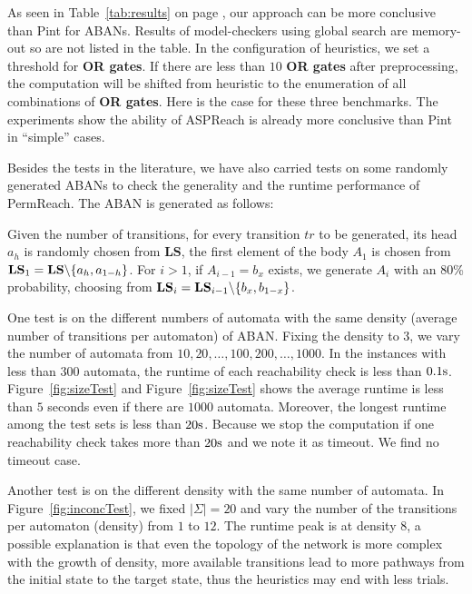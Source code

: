 As seen in Table~\ref{tab:results} on page \pageref{tab:results}, our approach can be more conclusive than Pint for ABANs.
Results of model-checkers using global search are memory-out so are not listed in the table.
In the configuration of heuristics, we set a threshold for \textbf{OR gates}.
If there are less than $10$ \textbf{OR gates} after preprocessing, the computation will be shifted from heuristic to the enumeration of all combinations of \textbf{OR gates}.
Here is the case for these three benchmarks. The experiments show the ability of ASPReach is already more conclusive than Pint in ``simple'' cases.

Besides the tests in the literature, we have also carried tests on some randomly generated ABANs to check the generality and the runtime performance of PermReach. 
The ABAN is generated as follows:

Given the number of transitions, for every transition $tr$ to be generated, its head $a_h$ is randomly chosen from $\mathbf{LS}$, the first element of the body $A_1$ is chosen from $\mathbf{LS}_1=\mathbf{LS}\miset{a_h,a_{1-h}}$.
For $i>1$, if $A_{i-1}=b_x$ exists, we generate $A_i$ with an 80\% probability, choosing from $\mathbf{LS}_i=\mathbf{LS}_{i-1}\miset{b_x,b_{1-x}}$. 
 
One test is on the different numbers of automata with the same density (average number of transitions per automaton) of ABAN. Fixing the density to 3, we vary the number of automata from $10,20,\ldots,100,200,\ldots,1000$.
In the instances with less than 300 automata, the runtime of each reachability check is less than $0.1{\rm s}$.
Figure~\ref{fig:sizeTest} and Figure~\ref{fig:sizeTest} shows the average runtime is less than $5$ seconds even if there are $1000$ automata. 
Moreover, the longest runtime among the test sets is less than $20{\rm s}$. 
Because we stop the computation if one reachability check takes more than $20{\rm s}$ and we note it as timeout.
We find no timeout case.

Another test is on the different density with the same number of automata. 
In Figure~\ref{fig:inconcTest}, we fixed $|\Sigma|=20$ and vary the number of the transitions per automaton (density) from $1$ to $12$.
The runtime peak is at density 8, a possible explanation is that even the topology of the network is more complex with the growth of density, more available transitions lead to more pathways from the initial state to the target state, thus the heuristics may end with less trials.

